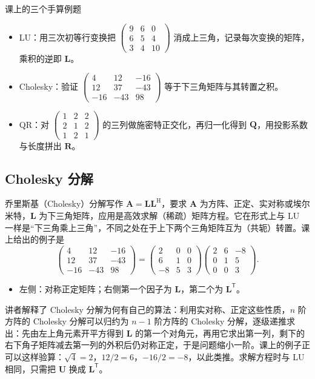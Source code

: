 \documentclass[a4paper]{article}
\begin{document}
\begin{practicebox}{课上的三个手算例题}
\begin{itemize}
\item LU：用三次初等行变换把 $\begin{pmatrix}9&6&0\\6&5&4\\3&4&10\end{pmatrix}$ 消成上三角，记录每次变换的矩阵，乘积的逆即 $\boldsymbol L$。
\item Cholesky：验证 $\begin{pmatrix}4&12&-16\\12&37&-43\\-16&-43&98\end{pmatrix}$ 等于下三角矩阵与其转置之积。
\item QR：对 $\begin{pmatrix}1&2&2\\2&1&2\\1&2&1\end{pmatrix}$ 的三列做施密特正交化，再归一化得到 $\boldsymbol Q$，用投影系数与长度拼出 $\boldsymbol R$。
\end{itemize}
\end{practicebox}

\subsection{Cholesky 分解}

乔里斯基（Cholesky）分解写作 $\boldsymbol A=\boldsymbol L\boldsymbol L^{\mathrm H}$，要求 $\boldsymbol A$ 为方阵、正定、实对称或埃尔米特，$\boldsymbol L$ 为下三角矩阵，应用是高效求解（稀疏）矩阵方程。它在形式上与 LU 一样是“下三角乘上三角”，不同之处在于上下两个三角矩阵互为（共轭）转置。课上给出的例子是
\[
\begin{pmatrix}4&12&-16\\12&37&-43\\-16&-43&98\end{pmatrix}
=\begin{pmatrix}2&0&0\\6&1&0\\-8&5&3\end{pmatrix}
\begin{pmatrix}2&6&-8\\0&1&5\\0&0&3\end{pmatrix}.
\]
\begin{itemize}
\item 左侧：对称正定矩阵；右侧第一个因子为 $\boldsymbol L$，第二个为 $\boldsymbol L^{\mathsf T}$。
\end{itemize}
讲者解释了 Cholesky 分解为何有自己的算法：利用实对称、正定这些性质，$n$ 阶方阵的 Cholesky 分解可以归约为 $n-1$ 阶方阵的 Cholesky 分解，逐级递推求出：先由左上角元素开平方得到 $\boldsymbol L$ 的第一个对角元，再用它求出第一列，剩下的右下角子矩阵减去第一列的外积后仍对称正定，于是问题缩小一阶。课上的例子正可以这样验算：$\sqrt4=2$，$12/2=6$，$-16/2=-8$，以此类推。求解方程时与 LU 相同，只需把 $\boldsymbol U$ 换成 $\boldsymbol L^{\mathsf T}$。
\end{document}
